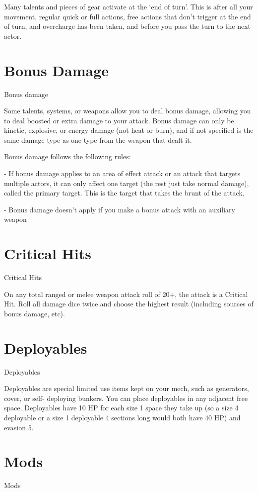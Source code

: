 Many talents and pieces of gear activate at the ‘end of turn’. This is after all your movement,
regular quick or full actions, free actions that don’t trigger at the end of turn, and overcharge has
been taken, and before you pass the turn to the next actor.

\section{Bonus Damage}
\hypertarget{Bonus Damage}{Bonus damage}

Some talents, systems, or weapons allow you to deal bonus damage, allowing you to deal
boosted or extra damage to your attack. Bonus damage can only be kinetic, explosive, or energy
damage (not heat or burn), and if not specified is the same damage type as one type from the
weapon that dealt it.

Bonus damage follows the following rules:

         	- If bonus damage applies to an area of effect attack or an attack that targets multiple
         actors, it can only affect one target (the rest just take normal damage), called the primary
         target. This is the target that takes the brunt of the attack.

         	- Bonus damage doesn’t apply if you make a bonus attack with an auxiliary weapon

\section{Critical Hits}
\hypertarget{Critical Hits}{Critical Hits}

On any total ranged or melee weapon attack roll of 20+, the attack is a Critical Hit. Roll all
damage dice twice and choose the highest result (including sources of bonus damage, etc).
\section{Deployables}
\hypertarget{Deployable}{Deployables}

Deployables are special limited use items kept on your mech, such as generators, cover, or self-
deploying bunkers. You can place deployables in any adjacent free space. Deployables have 10
HP for each size 1 space they take up (so a size 4 deployable or a size 1 deployable 4 sections
long would both have 40 HP) and evasion 5.
\section{Mods}
\hypertarget{Mod}{Mods}


